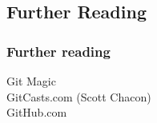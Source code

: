 \documentclass[english]{beamer}
\newcommand{\mysubsection}[2]{%
  \hypertarget{#2}{}%
  \subsection{#1}%
  \label{#2}%
}
\newcommand{\faint}[1]{%
\textcolor{code-gray}{#1}%
}
\newcommand{\blue}[1]{%
\textcolor{code-blue}{#1}%
}
\begin{document}
\mysubsection{Further Reading}{using:end}
\begin{frame}
\frametitle{Further reading}
\begin{center}
        \blue{Git Magic} \\
        \blue{GitCasts.com} \faint{(Scott Chacon)} \\
        \blue{GitHub.com} \\
\end{center}
\end{frame}

\end{document}
